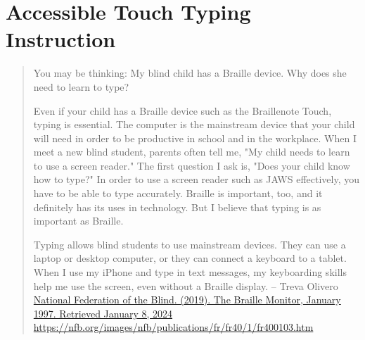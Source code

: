\pagebreak\hypertarget{appx5}{}\section[Accessible Touch Typing Instruction]{Accessible Touch Typing Instruction}\label{appx5}
\begin{leftbar}
    \begin{quote}
You may be thinking: My blind child has a Braille device. Why does she need to learn to type?

Even if your child has a Braille device such as the Braillenote Touch, typing is essential. The computer is the mainstream device that your child will need in order to be productive in school and in the workplace. When I meet a new blind student, parents often tell me, "My child needs to learn to use a screen reader." The first question I ask is, "Does your child know how to type?" In order to use a screen reader such as JAWS effectively, you have to be able to type accurately. Braille is important, too, and it definitely has its uses in technology. But I believe that typing is as important as Braille.

Typing allows blind students to use mainstream devices. They can use a laptop or desktop computer, or they can connect a keyboard to a tablet. When I use my iPhone and type in text messages, my keyboarding skills help me use the screen, even without a Braille display.
\break -- Treva Olivero \href{https://nfb.org/images/nfb/publications/fr/fr40/1/fr400103.htm}{National Federation of the Blind. (2019). The Braille Monitor, January 1997. Retrieved January 8, 2024} \break\url{https://nfb.org/images/nfb/publications/fr/fr40/1/fr400103.htm}
    \end{quote}
\end{leftbar}
